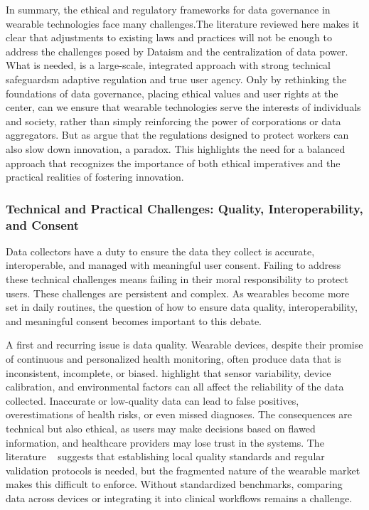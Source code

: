 	In summary, the ethical and regulatory frameworks for data governance in wearable technologies face many challenges.The literature reviewed here makes it clear that adjustments to existing laws and practices will not be enough to address the challenges posed by Dataism and the centralization of data power. What is needed, is a large-scale, integrated approach with strong technical safeguardsm adaptive regulation and true user agency.
	Only by rethinking the foundations of data governance, placing ethical values and user rights at the center, can we ensure that wearable technologies serve the interests of individuals and society, rather than simply reinforcing the 
	power of corporations or data aggregators. But as \cite{Aghion2021} argue that the regulations designed to protect workers can also slow down innovation, a paradox. This highlights the need for a balanced approach that recognizes the importance of both ethical imperatives and the practical realities of fostering innovation.
	\subsubsection{Technical and Practical Challenges: Quality, Interoperability, and Consent}

	Data collectors have a duty to ensure the data they collect is accurate, interoperable, and managed with meaningful user consent. Failing to address these technical challenges means failing in their moral responsibility to protect users. These challenges are persistent and complex. As wearables become more set in daily routines, the question of how to ensure data quality, interoperability, and meaningful consent becomes important to this debate.

	A first and recurring issue is data quality. Wearable devices, despite their promise of continuous and personalized health monitoring, often produce data that is inconsistent, incomplete, or biased. \cite{Canali2022} highlight that sensor variability, device calibration, and environmental factors can all affect the reliability of the data collected. Inaccurate or low-quality data can lead to false positives, overestimations of health risks, or even missed diagnoses. The consequences are technical but also ethical, as users may make decisions based on flawed information, and healthcare providers may lose trust in the systems. The literature ~\cite{Canali2022} suggests that establishing local quality standards and regular validation protocols is needed, but the fragmented nature of the wearable market makes this difficult to enforce. Without standardized benchmarks, comparing data across devices or integrating it into clinical workflows remains a challenge.


